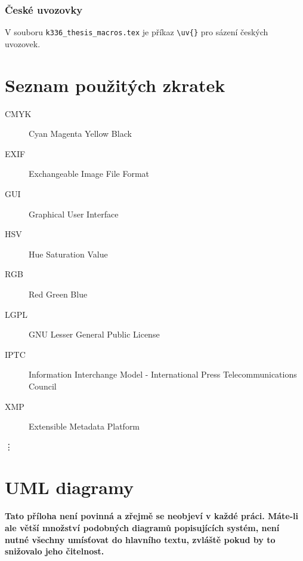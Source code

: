 \documentclass[11pt,twoside,a4paper]{book}
\begin{document}
\subsection{České uvozovky}
V souboru \verb|k336_thesis_macros.tex| je příkaz \verb|\uv{}| pro sázení českých uvozovek. 


\chapter{Seznam použitých zkratek}

\begin{description}
\item[CMYK] Cyan Magenta Yellow Black
\item[EXIF] Exchangeable Image File Format
\item[GUI] Graphical User Interface
\item[HSV] Hue Saturation Value
\item[RGB] Red Green Blue
\item[LGPL] GNU Lesser General Public License
\item[IPTC] Information Interchange Model - International Press Telecommunications Council
\item[XMP] Extensible Metadata Platform


\end{description}
\vdots

\chapter{UML diagramy}
\textbf{\large Tato příloha není povinná a zřejmě se neobjeví v každé práci. Máte-li ale větší množství podobných diagramů popisujících systém, není nutné všechny umísťovat do hlavního textu, zvláště pokud by to snižovalo jeho čitelnost.}
\end{document}
